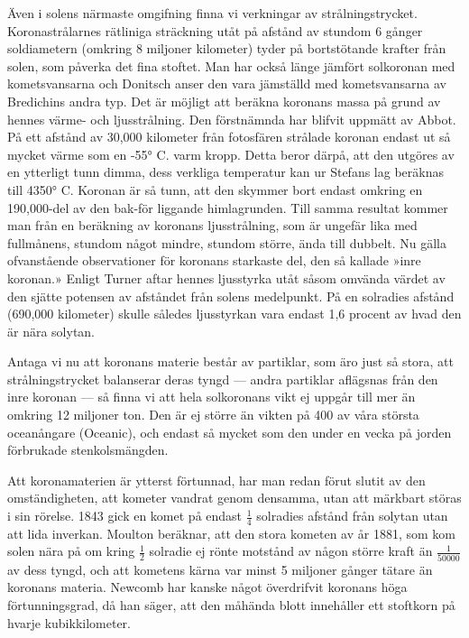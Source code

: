 \documentclass[a4paper, 12pt, oneside, swedish]{article}
\begin{document}
Även i solens närmaste omgifning finna vi verkningar av strålningstrycket. Koronastrålarnes rätliniga sträckning utåt på afstånd av stundom 6 gånger soldiametern (omkring 8 miljoner kilometer) tyder på bortstötande krafter från solen, som påverka det fina stoftet. Man har också länge jämfört solkoronan med kometsvansarna och Donitsch anser den vara jämställd med kometsvansarna av Bredichins andra typ. Det är möjligt att beräkna koronans massa på grund av hennes värme- och ljusstrålning. Den förstnämnda har blifvit uppmätt av Abbot. På ett afstånd av 30,000 kilometer från fotosfären strålade koronan endast ut så mycket värme som en -55° C. varm kropp. Detta beror därpå, att den utgöres av en ytterligt tunn dimma, dess verkliga temperatur kan ur Stefans lag beräknas till 4350° C. Koronan är så tunn, att den skymmer bort endast omkring en 190,000-del av den bak-för liggande himlagrunden. Till samma resultat kommer man från en beräkning av koronans ljusstrålning, som är ungefär lika med fullmånens, stundom något mindre, stundom större, ända till dubbelt. Nu gälla ofvanstående observationer för koronans starkaste del, den så kallade »inre koronan.» Enligt Turner aftar hennes ljusstyrka utåt såsom omvända värdet av den sjätte potensen av afståndet från solens medelpunkt. På en solradies afstånd (690,000 kilometer) skulle således ljusstyrkan vara endast 1,6 procent av hvad den är nära solytan.

Antaga vi nu att koronans materie består av partiklar, som äro just så stora, att strålningstrycket balanserar deras tyngd --- andra partiklar aflägsnas från den inre koronan --- så finna vi att hela solkoronans vikt ej uppgår till mer än omkring 12 miljoner ton. Den är ej större än vikten på 400 av våra största oceanångare (Oceanic), och endast så mycket som den under en vecka på jorden förbrukade stenkolsmängden.

Att koronamaterien är ytterst förtunnad, har man redan förut slutit av den omständigheten, att kometer vandrat genom densamma, utan att märkbart störas i sin rörelse. 1843 gick en komet på endast $\frac{1}{4}$ solradies afstånd från solytan utan att lida inverkan. Moulton beräknar, att den stora kometen av år 1881, som kom solen nära på om kring $\frac{1}{2}$ solradie ej rönte motstånd av någon större kraft än $\frac{1}{50000}$ av dess tyngd, och att kometens kärna var minst 5 miljoner gånger tätare än koronans materia. Newcomb har kanske något överdrifvit koronans höga förtunningsgrad, då han säger, att den måhända blott innehåller ett stoftkorn på hvarje kubikkilometer.
\end{document}
